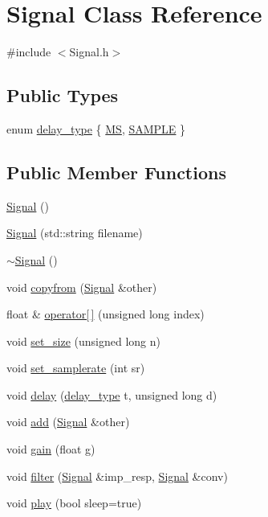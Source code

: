 \hypertarget{class_signal}{\section{\-Signal \-Class \-Reference}
\label{class_signal}
}


{\ttfamily \#include $<$\-Signal.\-h$>$}

\subsection*{\-Public \-Types}
\begin{DoxyCompactItemize}
\item 
enum \hyperlink{class_signal_a45a2f1394f9d0be6fbaaf5160fa4817c}{delay\-\_\-type} \{ \hyperlink{class_signal_a45a2f1394f9d0be6fbaaf5160fa4817caef04e6566ce27c94225e907c909af620}{\-M\-S}, 
\hyperlink{class_signal_a45a2f1394f9d0be6fbaaf5160fa4817ca29508a29e1f1dfb176239b6eb843c53d}{\-S\-A\-M\-P\-L\-E}
 \}
\end{DoxyCompactItemize}
\subsection*{\-Public \-Member \-Functions}
\begin{DoxyCompactItemize}
\item 
\hyperlink{class_signal_a7e69e538253d90c3f551f4701a1f94a5}{\-Signal} ()
\item 
\hyperlink{class_signal_a790a11398e80a3dc45150929d125c106}{\-Signal} (std\-::string filename)
\item 
\hyperlink{class_signal_ae7a1d116cda63e790bf9aab549d57d3a}{$\sim$\-Signal} ()
\item 
void \hyperlink{class_signal_aeb64be9cdd11502baf340a9afe90ec51}{copyfrom} (\hyperlink{class_signal}{\-Signal} \&other)
\item 
float \& \hyperlink{class_signal_a266bed8696158c9942ee52d05042ddef}{operator\mbox{[}$\,$\mbox{]}} (unsigned long index)
\item 
void \hyperlink{class_signal_a3f498716b36a015db3cb536879b908b4}{set\-\_\-size} (unsigned long n)
\item 
void \hyperlink{class_signal_a62a8aa2204f3fd0b657b0985bca45f76}{set\-\_\-samplerate} (int sr)
\item 
void \hyperlink{class_signal_af3e3df149202f2d4ead2fa9fcd2310ab}{delay} (\hyperlink{class_signal_a45a2f1394f9d0be6fbaaf5160fa4817c}{delay\-\_\-type} t, unsigned long d)
\item 
void \hyperlink{class_signal_ab963fe5eed48884fcb658fefcd7ea5da}{add} (\hyperlink{class_signal}{\-Signal} \&other)
\item 
void \hyperlink{class_signal_aa401154561534befea47331297689e74}{gain} (float g)
\item 
void \hyperlink{class_signal_a9a7011d55cd3eba679b78a3025953a25}{filter} (\hyperlink{class_signal}{\-Signal} \&imp\-\_\-resp, \hyperlink{class_signal}{\-Signal} \&conv)
\item 
void \hyperlink{class_signal_a5e8b9f3380ee51b93325391fedabbfe1}{play} (bool sleep=true)
\end{DoxyCompactItemize}
